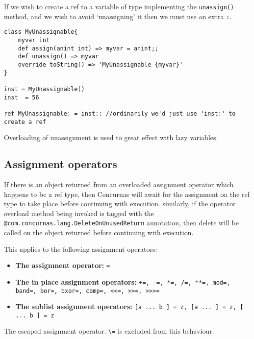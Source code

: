\documentclass[conc-doc]{subfiles}
\begin{document}
If we wish to create a ref to a variable of type implementing the \lstinline{unassign()} method, and we wish to avoid ‘unassigning’ it then we must use an extra \lstinline{:}.

\begin{lstlisting}
class MyUnassignable{
	myvar int
	def assign(anint int) => myvar = anint;;
	def unassign() => myvar
	override toString() => 'MyUnassignable {myvar}'
}

inst = MyUnassignable()
inst  = 56

ref MyUnassignable: = inst:: //ordinarily we'd just use 'inst:' to create a ref
\end{lstlisting}

Overloading of unassignment is used to great effect with lazy variables.

\subsection{Assignment operators}
If there is an object returned from an overloaded assignment operator which happens to be a ref type, then Concurnas will await for the assignment on the ref type to take place before continuing with execution. similarly, if the operator overload method being invoked is tagged with the \lstinline{@com.concurnas.lang.DeleteOnUnusedReturn} annotation, then delete will be called on the object returned before continuing with execution.

This applies to the following assignment operators: 
\begin{itemize}
	\item \textbf{The assignment operator:} \lstinline{=}
	\item \textbf{The in place assignment operators:} \lstinline{+=, -=, *=, /=, **=, mod=, band=, bor=, bxor=, comp=, <<=, >>=, >>>=}
	\item \textbf{The sublist assignment operators:} \lstinline{[a ... b ] = z, [a ... ] = z, [ ... b ] = z}
\end{itemize}

The escaped assignment operator: \lstinline{\=} is excluded from this behaviour.
\end{document}
